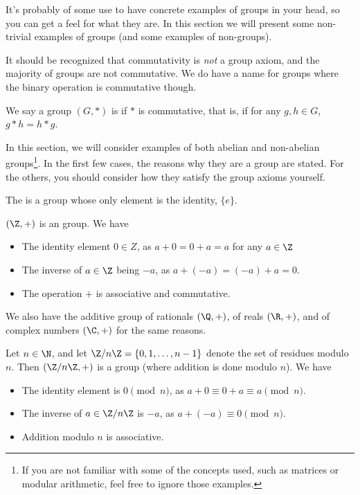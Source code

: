 
It's probably of some use to have concrete examples of groups in your head, so you can get a feel for what they are. In this section we will present some non-trivial examples of groups (and some examples of non-groups).

It should be recognized that commutativity is \emph{not} a group axiom, and the majority of groups are not commutative. We do have a name for groups where the binary operation is commutative though.

\begin{definition}
	We say a group $(G, *)$ is  if $*$ is commutative, that is, if for any $g, h \in G$, $g * h = h * g$.
\end{definition}

In this section, we will consider examples of both abelian and non-abelian groups\footnote{If you are not familiar with some of the concepts used, such as matrices or modular arithmetic, feel free to ignore those examples.}. In the first few cases, the reasons why they are a group are stated. For the others, you should consider how they satisfy the group axioms yourself. 

\begin{example}
	The  is a group whose only element is the identity, $\{ e \}$.
\end{example}

\begin{example}
	$(\Z, +)$ is an group. We have
	\begin{itemize}
		\item The identity element $0 \in Z$, as $a + 0 = 0 + a = a$ for any $a \in \Z$
		\item The inverse of $a \in \Z$ being $-a$, as $a + (-a) = (-a) + a = 0$. 
		\item The operation $+$ is associative and commutative.
	\end{itemize}
\end{example}
We also have the additive group of rationals $(\Q, +)$, of reals $(\R, +)$, and of complex numbers $(\C, +)$ for the same reasons.

\begin{example}
	Let $n \in \N$, and let $\Z/n \Z = \{0, 1, \dots, n - 1\}$ denote the set of residues modulo $n$. Then $(\Z/n\Z, +)$ is a group (where addition is done modulo $n$). We have
	\begin{itemize}
		\item The identity element is $0 \pmod{n}$, as $a + 0 \equiv 0 + a \equiv a \pmod{n}$.
		\item The inverse of $a \in \Z/n\Z$ is $-a$, as $a + (-a) \equiv 0 \pmod{n}$.
		\item Addition modulo $n$ is associative.
	\end{itemize}
\end{example}

